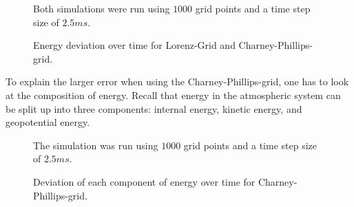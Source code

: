 \begin{figure}[!h]
    \caption{Energy deviation over time for Lorenz-Grid and Charney-Phillips-grid.}
    \label{fig:energy_error}
    \small
Both simulations were run using $1000$ grid points and a time step size of $2.5ms$.
\end{figure}

To explain the larger error when using the Charney-Phillips-grid, one has to look at the composition of energy.
Recall that energy in the atmospheric system can be split up into three components: internal energy, kinetic energy, and geopotential energy.

\begin{figure}[!h]
    \caption{Deviation of each component of energy over time for Charney-Phillips-grid.}
    \label{fig:cp_energy_split}
    \small
    The simulation was run using $1000$ grid points and a time step size of $2.5ms$.
\end{figure}

